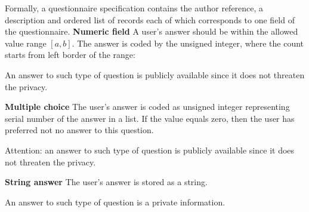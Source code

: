 Formally, a questionnaire specification contains the author reference, a description and ordered list of records each of which corresponds to one field of the questionnaire.
%
%
\textbf{Numeric field}
%
%
 A user’s answer should be within the allowed value range $[a,b]$. The answer is coded by the unsigned integer, where the count starts from left border of the range:
%

\begin{note}
An answer to such type of question is publicly available since it does not threaten the privacy.
\end{note}

%
\textbf{Multiple choice}
%
%
The user’s answer is coded as unsigned integer representing serial number of the answer in a list.
%
%
If the value equals zero, then the user has preferred not no answer to this question.

\begin{note}
Attention: an answer to such type of question is publicly available since it does not threaten the privacy.
\end{note}




\textbf{String answer}
%
%
 The user’s answer is stored as a string.
%
%
\begin{note}
An answer to such type of question is a private information.
\end{note}

